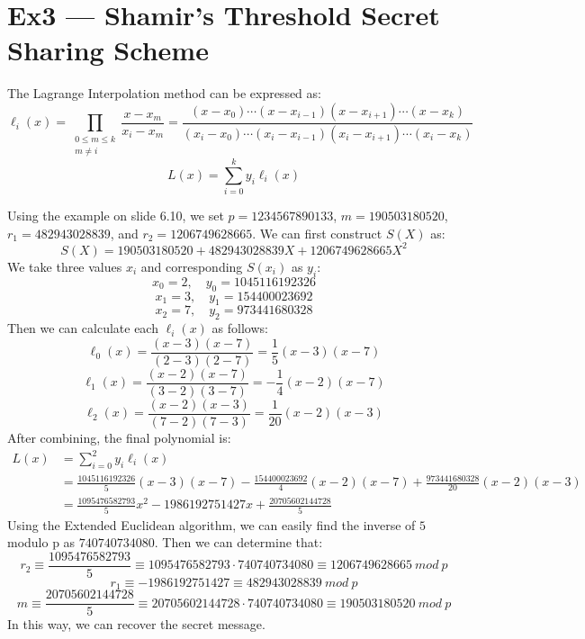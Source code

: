 \documentclass[12pt, a4paper]{article}
\begin{document}
\section*{Ex3 --- Shamir’s Threshold Secret Sharing Scheme}
The Lagrange Interpolation method can be expressed as:
$$
\ell_i(x) = \prod_{\begin{smallmatrix} 0\leq m\leq k\\ m \neq i \end{smallmatrix}} \frac{x - x_m}{x_i - x_m} = 
\frac{(x - x_0)\cdots (x - x_{i-1})(x - x_{i+1})\cdots (x - x_k)}{(x_i - x_0)\cdots (x_i - x_{i-1})(x_i - x_{i+1})\cdots (x_i - x_k)}
$$
$$L(x) = \sum_{i=0}^k y_i \ell_i(x)$$

Using the example on slide 6.10, we set $p = 1234567890133$, $m = 190503180520$, $r_1 = 482943028839$, 
and $r_2 = 1206749628665$. We can first construct $S(X)$ as:
$$S(X) = 190503180520 + 482943028839X + 1206749628665X^2$$
We take three values $x_i$ and corresponding $S(x_i)$ as $y_i$:
$$x_0 = 2,\quad y_0 = 1045116192326$$
$$x_1 = 3,\quad y_1 = 154400023692$$
$$x_2 = 7,\quad y_2 = 973441680328$$
Then we can calculate each $\ell_i(x)$ as follows:
$$\ell_0(x) = \frac{(x-3)(x-7)}{(2-3)(2-7)} = \frac{1}{5}(x-3)(x-7)$$
$$\ell_1(x) = \frac{(x-2)(x-7)}{(3-2)(3-7)} = -\frac{1}{4}(x-2)(x-7)$$
$$\ell_2(x) = \frac{(x-2)(x-3)}{(7-2)(7-3)} = \frac{1}{20}(x-2)(x-3)$$
After combining, the final polynomial is:
\begin{align*}
    L(x) &= \sum_{i=0}^2 y_i\ell_i(x)\\
         &= \frac{1045116192326}{5}(x-3)(x-7) - \frac{154400023692}{4}(x-2)(x-7) + \frac{973441680328}{20}(x-2)(x-3)\\
         &= \frac{1095476582793}{5}x^2 - 1986192751427x + \frac{20705602144728}{5}
\end{align*}
Using the Extended Euclidean algorithm, we can easily find the inverse of $5$ modulo p as $740740734080$. 
Then we can determine that:
$$r_2 \equiv \frac{1095476582793}{5} \equiv 1095476582793\cdot 740740734080 \equiv 1206749628665\ mod\ p$$
$$r_1 \equiv -1986192751427 \equiv 482943028839\ mod\ p$$
$$m \equiv \frac{20705602144728}{5} \equiv 20705602144728\cdot 740740734080 \equiv 190503180520\ mod\ p$$
In this way, we can recover the secret message.
\end{document}
